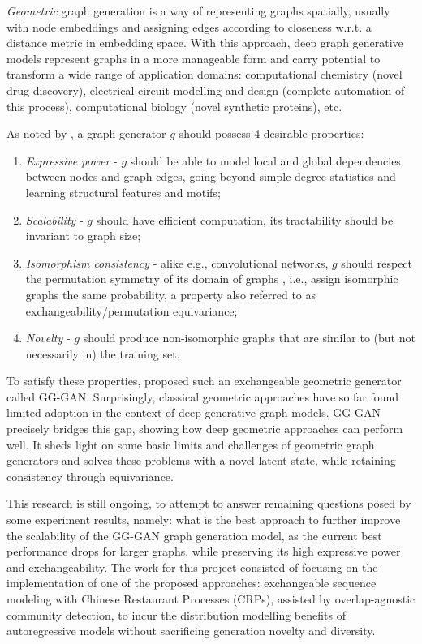 \emph{Geometric} graph generation is a way of representing graphs spatially, usually with node embeddings and assigning edges according to closeness w.r.t. a distance metric in embedding space. With this approach, deep graph generative models represent graphs in a more manageable form and carry potential to transform a wide range of application domains: computational chemistry (novel drug discovery), electrical circuit modelling and design (complete automation of this process), computational biology (novel synthetic proteins), etc.

As noted by \cite{krawczuk_gg-gan_2020}, a graph generator $g$ should possess 4 desirable properties:
\begin{enumerate}[1.]
\item \emph{Expressive power} - $g$ should be able to model local and global dependencies between nodes and graph edges, going beyond simple degree statistics and learning structural features and motifs;
\item \emph{Scalability} - $g$ should have efficient computation, its tractability should be invariant to graph size;
\item \emph{Isomorphism consistency} - alike e.g., convolutional networks, $g$ should respect the permutation symmetry of its domain of graphs \cite{bronstein_geometric_2021}, i.e., assign isomorphic graphs the same probability, a property also referred to as exchangeability/permutation equivariance;
\item \emph{Novelty} - $g$ should produce non-isomorphic graphs that are similar to (but not necessarily in) the training set.
\end{enumerate}

To satisfy these properties, \cite{krawczuk_gg-gan_2020} proposed such an exchangeable geometric generator called GG-GAN. Surprisingly, classical geometric approaches have so far found limited adoption in the context of deep generative graph models. GG-GAN precisely bridges this gap, showing how deep geometric approaches can perform well. It sheds light on some basic limits and challenges of geometric graph generators and solves these problems with a novel latent state, while retaining consistency through equivariance.

This research is still ongoing, to attempt to answer remaining questions posed by some experiment results, namely: what is the best approach to further improve the scalability of the GG-GAN graph generation model, as the current best performance drops for larger graphs, while preserving its high expressive power and exchangeability. The work for this project consisted of focusing on the implementation of one of the proposed approaches: exchangeable sequence modeling with Chinese Restaurant Processes (CRPs), assisted by overlap-agnostic community detection, to incur the distribution modelling benefits of autoregressive models without sacrificing generation novelty and diversity. 

